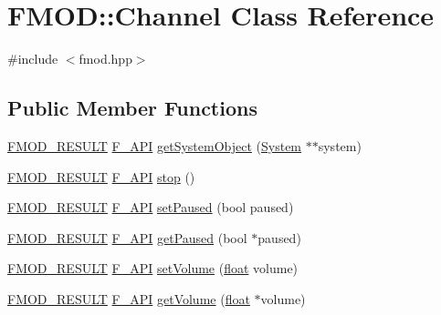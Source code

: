 \hypertarget{class_f_m_o_d_1_1_channel}{\section{F\-M\-O\-D\-:\-:Channel Class Reference}
\label{class_f_m_o_d_1_1_channel}
}


{\ttfamily \#include $<$fmod.\-hpp$>$}

\subsection*{Public Member Functions}
\begin{DoxyCompactItemize}
\item 
\hyperlink{fmod_8h_ae6ddadf8cb315e93ae7e6456b19db276}{F\-M\-O\-D\-\_\-\-R\-E\-S\-U\-L\-T} \hyperlink{fmod_8h_ace803d13e798b0cdde4384f9f323b901}{F\-\_\-\-A\-P\-I} \hyperlink{class_f_m_o_d_1_1_channel_ade71450e7b8a888d4a4f1e73eded4236}{get\-System\-Object} (\hyperlink{class_f_m_o_d_1_1_system}{System} $\ast$$\ast$system)
\item 
\hyperlink{fmod_8h_ae6ddadf8cb315e93ae7e6456b19db276}{F\-M\-O\-D\-\_\-\-R\-E\-S\-U\-L\-T} \hyperlink{fmod_8h_ace803d13e798b0cdde4384f9f323b901}{F\-\_\-\-A\-P\-I} \hyperlink{class_f_m_o_d_1_1_channel_a89d7bc13ea65f29f306fbd279e54dd08}{stop} ()
\item 
\hyperlink{fmod_8h_ae6ddadf8cb315e93ae7e6456b19db276}{F\-M\-O\-D\-\_\-\-R\-E\-S\-U\-L\-T} \hyperlink{fmod_8h_ace803d13e798b0cdde4384f9f323b901}{F\-\_\-\-A\-P\-I} \hyperlink{class_f_m_o_d_1_1_channel_a7610d6be6beec8f7cf6d0230c48c6618}{set\-Paused} (bool paused)
\item 
\hyperlink{fmod_8h_ae6ddadf8cb315e93ae7e6456b19db276}{F\-M\-O\-D\-\_\-\-R\-E\-S\-U\-L\-T} \hyperlink{fmod_8h_ace803d13e798b0cdde4384f9f323b901}{F\-\_\-\-A\-P\-I} \hyperlink{class_f_m_o_d_1_1_channel_a551d39aed652cb419ce5ec7256abefb4}{get\-Paused} (bool $\ast$paused)
\item 
\hyperlink{fmod_8h_ae6ddadf8cb315e93ae7e6456b19db276}{F\-M\-O\-D\-\_\-\-R\-E\-S\-U\-L\-T} \hyperlink{fmod_8h_ace803d13e798b0cdde4384f9f323b901}{F\-\_\-\-A\-P\-I} \hyperlink{class_f_m_o_d_1_1_channel_a641ee780642531cec59aa9ec065d4709}{set\-Volume} (\hyperlink{fmod_8h_aeb841aa4b4b5f444b5d739d865b420af}{float} volume)
\item 
\hyperlink{fmod_8h_ae6ddadf8cb315e93ae7e6456b19db276}{F\-M\-O\-D\-\_\-\-R\-E\-S\-U\-L\-T} \hyperlink{fmod_8h_ace803d13e798b0cdde4384f9f323b901}{F\-\_\-\-A\-P\-I} \hyperlink{class_f_m_o_d_1_1_channel_aef6f0675ac455547e3a00ce339ca85f9}{get\-Volume} (\hyperlink{fmod_8h_aeb841aa4b4b5f444b5d739d865b420af}{float} $\ast$volume)
$$
\end{DoxyCompactItemize}
